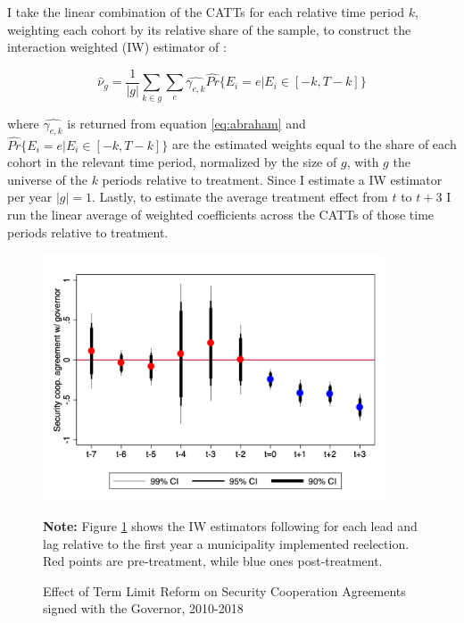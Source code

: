 \documentclass[12pt]{amsart}
\makeatletter
\def\section{\@startsection{section}{1}
	\z@{1.0\linespacing\@plus\linespacing}{.5\linespacing}{\Large}}
\numberwithin{equation}{section}
\theoremstyle{definition}
\theoremstyle{definition}
\theoremstyle{definition}
\makeatother
\begin{document}
I take the linear combination of the CATTs for each relative time period $k$, weighting each cohort by its relative share of the sample, to construct the interaction weighted (IW) estimator of \citet{abraham_sun_2020}:   

\begin{equation}
\hat{\nu}_g=\frac{1}{|g|}\sum_{k \in g}\sum_e \hat{\gamma_{e,k}} \hat{Pr}\{E_i=e | E_i \in [-k, T-k]\}	
\end{equation}

where $\hat{\gamma_{e,k}}$ is returned from equation \ref{eq:abraham} and $\hat{Pr}\{E_i=e | E_i \in [-k, T-k]\}$  are the estimated weights equal to the share of each cohort in the relevant time period, normalized by the size of  $g$, with $g$ the universe of the $k$ periods relative to treatment. Since I estimate a IW estimator per year $|g|=1$. Lastly, to estimate the average treatment effect from $t$ to $t+3$ I run the linear average of weighted coefficients across the CATTs of those time periods relative to treatment. 

\section{Main Results \label{sec:results}}

\begin{figure}[H] 
\centering
 \caption{Effect of Term Limit Reform on Security Cooperation Agreements signed with the Governor, 2010-2018}
 \label{fig:event_study_agreements}
\includegraphics[width=0.9\textwidth]{../Figures/catts_agreements.png}
       \captionsetup{justification=centering}
       
 \textbf{Note:} Figure \ref{fig:event_study_agreements} shows the IW estimators following \citet{abraham_sun_2020} for each lead and lag relative to the first year a municipality implemented reelection. Red points are pre-treatment, while blue ones post-treatment. 
  
\end{figure}   
   
\end{document}
